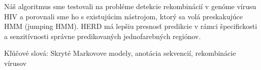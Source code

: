 \documentclass[12pt,oneside]{book}
\begin{document}
Náš algoritmus sme testovali na probléme detekcie rekombinácií v genóme vírusu
HIV a porovnali sme ho s existujúcim nástrojom, ktorý sa volá preskakujúce HMM
(jumping HMM). HERD má lepšiu presnosť predikcie v rámci špecifickosti a
senzitívnosti správne predikovaných jednofarebných regiónov.

\medskip
\noindent
{\sc Kľúčové slová}: Skryté Markovove modely, anotácia sekvencií, rekombinácie vírusov
\end{document}
